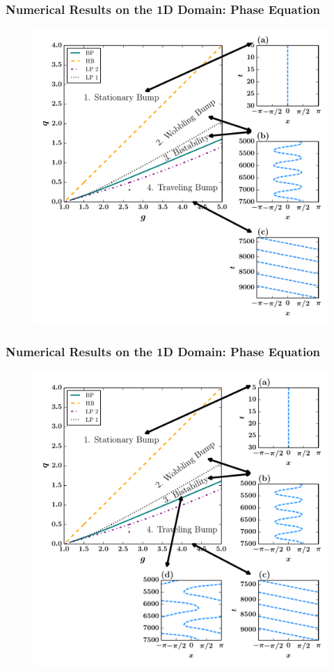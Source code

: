 \documentclass{beamer}
\begin{document}
\begin{frame}
\frametitle{Numerical Results on the 1D Domain: Phase Equation}
\begin{figure}
 \includegraphics[width=.7\textwidth]{oned_phase_2par3.pdf}
\end{figure}
\end{frame}

\begin{frame}
\frametitle{Numerical Results on the 1D Domain: Phase Equation}
\begin{figure}
 \includegraphics[width=.7\textwidth]{oned_phase_2par4.pdf}
\end{figure}
\end{frame}
\end{document}

